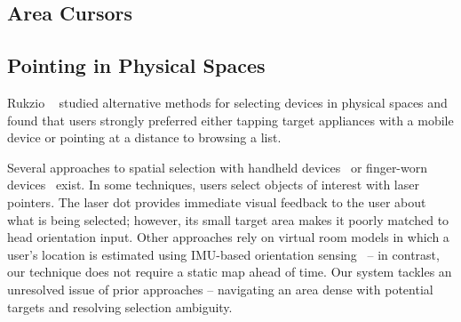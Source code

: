 \subsection{Area Cursors}

\subsection{Pointing in Physical Spaces}
Rukzio ~\cite{rukzio_experimental_2006} studied alternative methods for selecting devices in physical spaces and found that users strongly preferred either tapping target appliances with a mobile device or pointing at a distance to browsing a list.

Several approaches to spatial selection with handheld devices~\cite{beigl_point_1999,patel_2-way_2003,wilson_xwand:_2003,schmidt_picontrol:_2012,kemp_point-and-click_2008} or finger-worn devices~\cite{merrill_augmenting_2007} exist. 
In some techniques, users select objects of interest with laser pointers. The laser dot provides immediate visual feedback to the user about what is being selected; however, its small target area makes it poorly matched to head orientation input.
Other approaches rely on virtual room models in which a user's location is estimated using IMU-based orientation sensing~\cite{wilson_xwand:_2003,lifton_tricorder:_2007} -- in contrast, our technique does not require a static map ahead of time.
Our system tackles an unresolved issue of prior approaches -- navigating an area dense with potential targets and resolving selection ambiguity.

